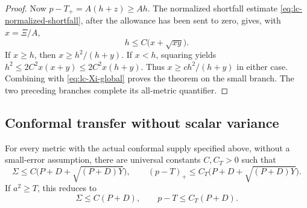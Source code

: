 \begin{proof}
Now $p-T_+=A(h+z)\ge Ah$.  The normalized shortfall estimate
\eqref{eq:lc-normalized-shortfall}, after the allowance has been
sent to zero, gives, with $x=\Xi/A$,
\[
 h\le C\bigl(x+\sqrt{xy}\bigr).
\]
If $x\ge h$, then $x\ge h^2/(h+y)$.  If $x<h$, squaring yields
$h^2\le2C^2x(x+y)\le2C^2x(h+y)$.  Thus
$x\ge c h^2/(h+y)$ in either case.  Combining with
\eqref{eq:lc-Xi-global} proves the theorem on the small branch.
The two preceding branches complete its all-metric quantifier.
\end{proof}

\subsection{Conformal transfer without scalar variance}

\begin{theorem}\label{thm:lc-scalar-free}
For every metric with the actual conformal supply specified above,
without a small-error assumption, there are universal constants
$C,C_T>0$ such that
\begin{equation}\label{eq:lc-scalar-free}
 \Sigma\le C\bigl(P+D+\sqrt{(P+D)Y}\bigr),\qquad
 (p-T)_+\le C_T\bigl(P+D+\sqrt{(P+D)Y}\bigr).
\end{equation}
If $a^2\ge T$, this reduces to
\begin{equation}\label{eq:lc-scalar-free-square}
 \Sigma\le C(P+D),\qquad p-T\le C_T(P+D).
\end{equation}
\end{theorem}

